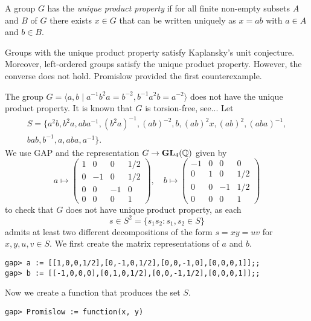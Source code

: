 \begin{definition}
A group $G$ has the \emph{unique product property} if 
for all finite non-empty subsets $A$ and $B$ of $G$ 
there exists $x\in G$ that can be written uniquely as
$x = ab$ with $a\in A$ and $b\in B$.
\end{definition}

Groups with the unique product property satisfy 
Kaplansky's unit conjecture. Moreover, 
left-ordered groups satisfy 
the unique product property. However, the converse
does not hold. Promislow provided the first counterexample.

\begin{example}
    The group $G=\langle a,b\mid a^{-1}b^2a=b^{-2},b^{-1}a^2b=a^{-2}\rangle$
    does not have the unique product property. 
    It is known that $G$ is torsion-free, see... 
    Let 
    \begin{multline}
    \label{eq:Promislow}
    S=\{ a^2b,
    b^2a,
    aba^{-1},
    (b^2a)^{-1},
    (ab)^{-2},
    b,
    (ab)^2x,
    (ab)^2,
    (aba)^{-1},\\
    bab,
    b^{-1},
    a,
    aba,
    a^{-1}
    \}.
    \end{multline}
    We use \textsf{GAP} and the representation $G\to\mathbf{GL}_4(\mathbb{Q})$ given by 
    \[
a\mapsto\begin{pmatrix}
1 & 0 & 0 & 1/2\\
0 & -1 & 0 & 1/2\\
0 & 0 & -1 & 0\\
0 & 0 & 0 & 1
\end{pmatrix},
\quad
b\mapsto\begin{pmatrix}
-1 & 0 & 0 & 0\\
0 & 1 & 0 & 1/2\\
0 & 0 & -1 & 1/2\\
0 & 0 & 0 & 1
\end{pmatrix}
\]
    to check that 
    $G$ does not have
    unique product property, as each 
    \[
    s\in S^2=\{s_1s_2:s_1,s_2\in S\}
    \]
    admits at least two different decompositions of the 
    form $s=xy=uv$ for $x,y,u,v\in S$. 
    We first create the matrix representations of $a$ and $b$.
\begin{lstlisting}
gap> a := [[1,0,0,1/2],[0,-1,0,1/2],[0,0,-1,0],[0,0,0,1]];;
gap> b := [[-1,0,0,0],[0,1,0,1/2],[0,0,-1,1/2],[0,0,0,1]];;
\end{lstlisting}
    Now we create
    a function that produces the set $S$.
\begin{lstlisting}
gap> Promislow := function(x, y)

\end{lstlisting}
\end{example}
